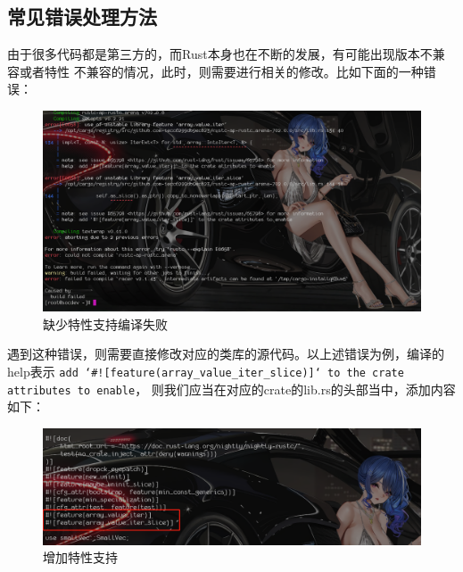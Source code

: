 \subsection{常见错误处理方法}
由于很多代码都是第三方的，而Rust本身也在不断的发展，有可能出现版本不兼容或者特性
不兼容的情况，此时，则需要进行相关的修改。比如下面的一种错误：
\begin{figure}[H]
  \centering
  \includegraphics[width=\linewidth]{rust_feature_error.png}
  \caption{缺少特性支持编译失败}
  \label{fig:rust_feature_error}
\end{figure}
遇到这种错误，则需要直接修改对应的类库的源代码。以上述错误为例，编译的help表示
\texttt{add `#![feature(array_value_iter_slice)]` to the crate attributes to enable}，
则我们应当在对应的crate的lib.rs的头部当中，添加内容如下：
\begin{figure}[H]
  \centering
  \includegraphics[width=\linewidth]{rust_feature_add.png}
  \caption{增加特性支持}
  \label{fig:rust_feature_add}
\end{figure}
